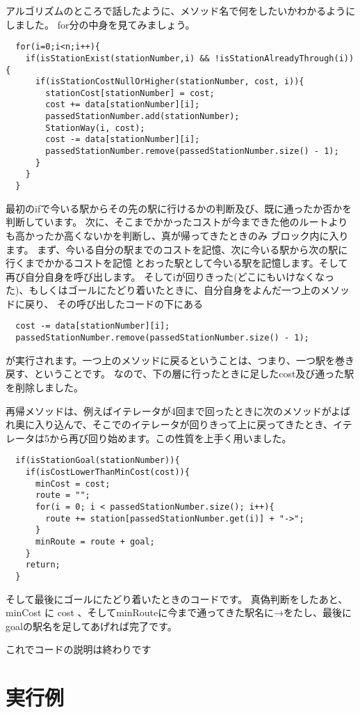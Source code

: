 \documentclass[titlepage]{jarticle}
\begin{document}
アルゴリズムのところで話したように、メソッド名で何をしたいかわかるようにしました。
for分の中身を見てみましょう。

\begin{verbatim}
  for(i=0;i<n;i++){
    if(isStationExist(stationNumber,i) && !isStationAlreadyThrough(i)){
      if(isStationCostNullOrHigher(stationNumber, cost, i)){
        stationCost[stationNumber] = cost;
        cost += data[stationNumber][i];
        passedStationNumber.add(stationNumber);
        StationWay(i, cost);
        cost -= data[stationNumber][i];
        passedStationNumber.remove(passedStationNumber.size() - 1);
      }
    }
  }
\end{verbatim}

最初のifで今いる駅からその先の駅に行けるかの判断及び、既に通ったか否かを判断しています。
次に、そこまでかかったコストが今まできた他のルートよりも高かったか高くないかを判断し、真が帰ってきたときのみ
ブロック内に入ります。
まず、今いる自分の駅までのコストを記憶、次に今いる駅から次の駅に行くまでかかるコストを記憶
とおった駅として今いる駅を記憶します。そして再び自分自身を呼び出します。
そしてiが回りきった(どこにもいけなくなった)、もしくはゴールにたどり着いたときに、自分自身をよんだ一つ上のメソッドに戻り、
その呼び出したコードの下にある
\begin{verbatim}
  cost -= data[stationNumber][i];
  passedStationNumber.remove(passedStationNumber.size() - 1);
\end{verbatim}
が実行されます。一つ上のメソッドに戻るということは、つまり、一つ駅を巻き戻す、ということです。
なので、下の層に行ったときに足したcost及び通った駅を削除しました。

再帰メソッドは、例えばイテレータが4回まで回ったときに次のメソッドがよばれ奥に入り込んで、そこでのイテレータが回りきって上に戻ってきたとき、イテレータは5から再び回り始めます。この性質を上手く用いました。

\begin{verbatim}
  if(isStationGoal(stationNumber)){
    if(isCostLowerThanMinCost(cost)){
      minCost = cost;
      route = "";
      for(i = 0; i < passedStationNumber.size(); i++){
        route += station[passedStationNumber.get(i)] + "->";
      }
      minRoute = route + goal;
    }
    return;
  }
\end{verbatim}
そして最後にゴールにたどり着いたときのコードです。
真偽判断をしたあと、minCost に cost 、そしてminRouteに今まで通ってきた駅名に→をたし、最後にgoalの駅名を足してあげれば完了です。

これでコードの説明は終わりです
\section{実行例}
\end{document}
